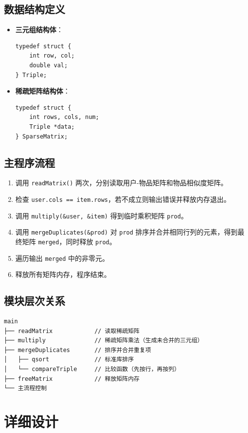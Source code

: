 \documentclass[UTF8]{ctexart}
\begin{document}
\subsection{数据结构定义}
\begin{itemize}
    \item \textbf{三元组结构体}：
\begin{lstlisting}
typedef struct {
    int row, col;
    double val;
} Triple;
\end{lstlisting}
    \item \textbf{稀疏矩阵结构体}：
\begin{lstlisting}
typedef struct {
    int rows, cols, num;
    Triple *data;
} SparseMatrix;
\end{lstlisting}
\end{itemize}

\subsection{主程序流程}
\begin{enumerate}
    \item 调用 \texttt{readMatrix()} 两次，分别读取用户-物品矩阵和物品相似度矩阵。
    \item 检查 \texttt{user.cols == item.rows}，若不成立则输出错误并释放内存退出。
    \item 调用 \texttt{multiply(\&user, \&item)} 得到临时乘积矩阵 \texttt{prod}。
    \item 调用 \texttt{mergeDuplicates(\&prod)} 对 \texttt{prod} 排序并合并相同行列的元素，得到最终矩阵 \texttt{merged}，同时释放 \texttt{prod}。
    \item 遍历输出 \texttt{merged} 中的非零元。
    \item 释放所有矩阵内存，程序结束。
\end{enumerate}

\subsection{模块层次关系}
\begin{verbatim}
main
├── readMatrix            // 读取稀疏矩阵
├── multiply              // 稀疏矩阵乘法（生成未合并的三元组）
├── mergeDuplicates       // 排序并合并重复项
│   ├── qsort             // 标准库排序
│   └── compareTriple     // 比较函数（先按行，再按列）
├── freeMatrix            // 释放矩阵内存
└── 主流程控制
\end{verbatim}

\section{详细设计}
\end{document}
